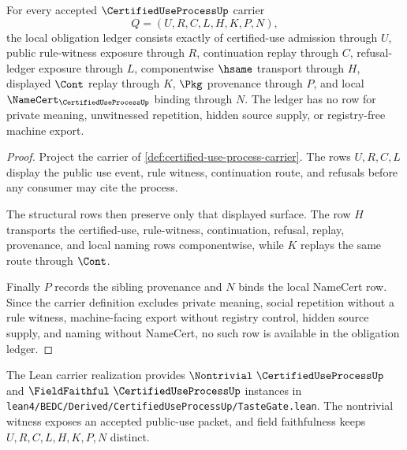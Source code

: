 \begin{theorem}
\label{thm:certified-use-process-obligation-ledger}
For every accepted $\CertifiedUseProcessUp$ carrier
$$
Q=(U,R,C,L,H,K,P,N),
$$
the local obligation ledger consists exactly of certified-use admission through $U$, public rule-witness exposure through $R$, continuation replay through $C$, refusal-ledger exposure through $L$, componentwise $\hsame$ transport through $H$, displayed $\Cont$ replay through $K$, $\Pkg$ provenance through $P$, and local $\NameCert_{\CertifiedUseProcessUp}$ binding through $N$. The ledger has no row for private meaning, unwitnessed repetition, hidden source supply, or registry-free machine export.
\end{theorem}
\begin{proof}
Project the carrier of \autoref{def:certified-use-process-carrier}. The rows $U,R,C,L$ display the public use event, rule witness, continuation route, and refusals before any consumer may cite the process.

The structural rows then preserve only that displayed surface. The row $H$ transports the certified-use, rule-witness, continuation, refusal, replay, provenance, and local naming rows componentwise, while $K$ replays the same route through $\Cont$.

Finally $P$ records the sibling provenance and $N$ binds the local NameCert row. Since the carrier definition excludes private meaning, social repetition without a rule witness, machine-facing export without registry control, hidden source supply, and naming without NameCert, no such row is available in the obligation ledger.
\end{proof}



The Lean carrier realization provides $\Nontrivial\ \CertifiedUseProcessUp$ and $\FieldFaithful\ \CertifiedUseProcessUp$ instances in \texttt{lean4/BEDC/Derived/CertifiedUseProcessUp/TasteGate.lean}. The nontrivial witness exposes an accepted public-use packet, and field faithfulness keeps $U,R,C,L,H,K,P,N$ distinct.

